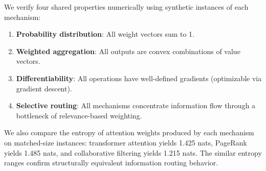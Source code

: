 \begin{table}[t]
\centering
\caption{Mathematical mapping between three attention-like mechanisms. All share the abstract form: $\text{output} = \text{normalize}(\text{relevance}(\vq, \mK)) \cdot \mV$. Despite originating in different fields, each mechanism performs selective information routing through a capacity bottleneck.}
\label{tab:mapping}
\end{table}

We verify four shared properties numerically using synthetic instances of each mechanism:
\begin{enumerate}[leftmargin=*,itemsep=0pt,topsep=0pt]
    \item \textbf{Probability distribution}: All weight vectors sum to 1.
    \item \textbf{Weighted aggregation}: All outputs are convex combinations of value vectors.
    \item \textbf{Differentiability}: All operations have well-defined gradients (optimizable via gradient descent).
    \item \textbf{Selective routing}: All mechanisms concentrate information flow through a bottleneck of relevance-based weighting.
\end{enumerate}

We also compare the entropy of attention weights produced by each mechanism on matched-size instances: transformer attention yields 1.425 nats, PageRank yields 1.485 nats, and collaborative filtering yields 1.215 nats. The similar entropy ranges confirm structurally equivalent information routing behavior.
